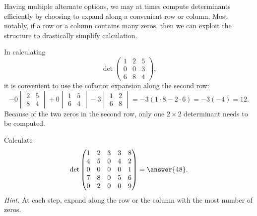 \documentclass{ximera}
\begin{document}
Having multiple alternate options, we may at times compute
determinants efficiently by choosing to expand along a convenient row
or column. Most notably, if a row or a column contains many zeros,
then we can exploit the structure to drastically simplify calculation.

\begin{example}
  In calculating
  \[
    \det
    \begin{pmatrix}
      1 & 2 & 5 \\
      0 & 0 & 3 \\
      6 & 8 & 4
    \end{pmatrix},
  \]
  it is convenient to use the cofactor expansion along the second row:
  \[
    - 0
    \begin{vmatrix}
      2 & 5 \\ 8 & 4
    \end{vmatrix}
    + 0
    \begin{vmatrix}
      1 & 5 \\ 6 & 4
    \end{vmatrix}
    - 3
    \begin{vmatrix}
      1 & 2 \\ 6 & 8
    \end{vmatrix}
    = -3 (1 \cdot 8 - 2 \cdot 6) = -3 (-4) = 12.
  \]
  Because of the two zeros in the second row, only one $2 \times 2$
  determinant needs to be computed.
\end{example}

\begin{question}
  Calculate
  \[
    \det
    \begin{pmatrix}
      1 & 2 & 3 & 3 & 8 \\
      4 & 5 & 0 & 4 & 2\\
      0 & 0 & 0 & 0 & 1 \\
      7 & 8 & 0 & 5 & 6 \\
      0 & 2 & 0 & 0 & 9
    \end{pmatrix} = \answer{48}.
  \]
  \textit{Hint.} At each step, expand along the row or the column with
  the most number of zeros.
  \begin{prompt}
  \end{prompt}
\end{question}
\end{document}
